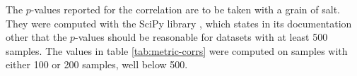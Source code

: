 The $p$-values reported for the correlation are to be taken with a grain of
salt. They were computed with the SciPy library \autocite{scipy}, which
states in its documentation other that the $p$-values should be reasonable
for datasets with at least 500 samples. The values in table
\ref{tab:metric-corrs} were computed on samples with either 100 or 200
samples, well below 500.
